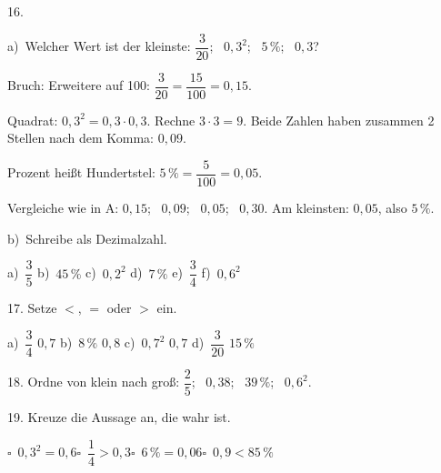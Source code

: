 \documentclass[11pt]{article}
\newcommand{\grau}[1]{{\color{mbgrau}#1}}
\begin{document}
\begin{pfaufg}{}{16.}{}
\grau{a)\ Welcher Wert ist der kleinste: $\dfrac{3}{20}$; \ $0{,}3^2$; \ $5\,\%$; \ $0{,}3$?\par\smallskip Bruch: Erweitere auf 100: $\dfrac{3}{20} = \dfrac{15}{100} = 0{,}15$.\par Quadrat: $0{,}3^2 = 0{,}3 \cdot 0{,}3$. Rechne $3 \cdot 3 = 9$. Beide Zahlen haben zusammen 2 Stellen nach dem Komma: $0{,}09$.\par Prozent heißt Hundertstel: $5\,\% = \dfrac{5}{100} = 0{,}05$.\par Vergleiche wie in A: $0{,}15$; \ $0{,}09$; \ $0{,}05$; \ $0{,}30$. Am kleinsten: $0{,}05$, also $5\,\%$.}
\par\medskip
b)\ Schreibe als Dezimalzahl.\par\vspace{3pt} a)~$\dfrac{3}{5}$ \qquad b)~$45\,\%$ \qquad c)~$0{,}2^2$ \qquad d)~$7\,\%$ \qquad e)~$\dfrac{3}{4}$ \qquad f)~$0{,}6^2$
\end{pfaufg}

\begin{pfaufg}{}{17.}{}
Setze $<$, $=$ oder $>$ ein.\par\vspace{3pt} a)~$\dfrac{3}{4}$ \leerfeld $0{,}7$ \qquad b)~$8\,\%$ \leerfeld $0{,}8$ \qquad c)~$0{,}7^2$ \leerfeld $0{,}7$ \qquad d)~$\dfrac{3}{20}$ \leerfeld $15\,\%$
\end{pfaufg}

\begin{pfaufg}{}{18.}{}
Ordne von klein nach groß: $\dfrac{2}{5}$; \ $0{,}38$; \ $39\,\%$; \ $0{,}6^2$.
\end{pfaufg}

\begin{pfaufg}{}{19.}{}
Kreuze die Aussage an, die wahr ist.\par\medskip\noindent\hspace*{7mm}\mbox{$\square$\ $0{,}3^2 = 0{,}6$}\hspace{10mm}\mbox{$\square$\ $\dfrac{1}{4} > 0{,}3$}\hspace{10mm}\mbox{$\square$\ $6\,\% = 0{,}06$}\hspace{10mm}\mbox{$\square$\ $0{,}9 < 85\,\%$}\rule[-3mm]{0pt}{8mm}\par\smallskip 
{}
\end{pfaufg}
\end{document}
